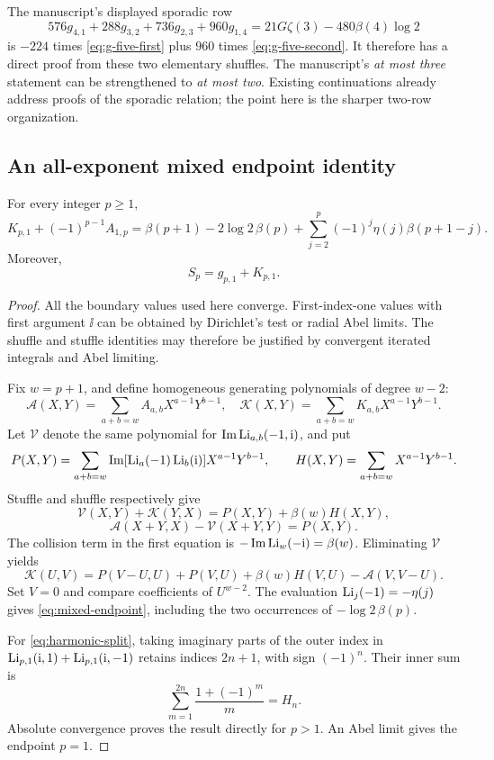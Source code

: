 The manuscript's displayed sporadic row
\[
 576g_{4,1}+288g_{3,2}+736g_{2,3}+960g_{1,4}
 =21G\zeta(3)-480\beta(4)\log2
\]
is \(-224\) times \eqref{eq:g-five-first} plus \(960\) times
\eqref{eq:g-five-second}. It therefore has a direct proof from
these two elementary shuffles. The manuscript's \emph{at most three}
statement can be strengthened to \emph{at most two}. Existing
continuations already address proofs of the sporadic relation; the
point here is the sharper two-row organization.

\subsection{An all-exponent mixed endpoint identity}

\begin{theorem}\label{thm:mixed-endpoint}
For every integer \(p\geq1\),
\begin{equation}\label{eq:mixed-endpoint}
 K_{p,1}+(-1)^{p-1}A_{1,p}
 =\beta(p+1)-2\log2\,\beta(p)
       +\sum_{j=2}^{p}(-1)^j\eta(j)\beta(p+1-j).
\end{equation}
Moreover,
\begin{equation}\label{eq:harmonic-split}
 S_p=g_{p,1}+K_{p,1}.
\end{equation}
\end{theorem}

\begin{proof}
All the boundary values used here converge. First-index-one values
with first argument \(\ii\) can be obtained by Dirichlet's test or
radial Abel limits. The shuffle and stuffle identities may therefore
be justified by convergent iterated integrals and Abel limiting.

Fix \(w=p+1\), and define homogeneous generating polynomials of
degree \(w-2\):
\[
 \mathscr A(X,Y)=\sum_{a+b=w}A_{a,b}X^{a-1}Y^{b-1},
 \quad
 \mathscr K(X,Y)=\sum_{a+b=w}K_{a,b}X^{a-1}Y^{b-1}.
\]
Let \(\mathscr V\) denote the same polynomial for
\(\operatorname{Im}\operatorname{Li}_{a,b}(-1,\mathrm{i})\), and put
\[
 P(X,Y)=\sum_{a+b=w}
  \operatorname{Im}[\operatorname{Li}_a(-1)\operatorname{Li}_b(\mathrm{i})]X^{a-1}Y^{b-1},
 \qquad
 H(X,Y)=\sum_{a+b=w}X^{a-1}Y^{b-1}.
\]
Stuffle and shuffle respectively give
\[
 \mathscr V(X,Y)+\mathscr K(Y,X)=P(X,Y)+\beta(w)H(X,Y),
\]
\[
 \mathscr A(X+Y,X)-\mathscr V(X+Y,Y)=P(X,Y).
\]
The collision term in the first equation is
\(-\operatorname{Im}\operatorname{Li}_w(-\mathrm{i})=\beta(w)\).
Eliminating \(\mathscr V\) yields
\[
 \mathscr K(U,V)=P(V-U,U)+P(V,U)+\beta(w)H(V,U)
                  -\mathscr A(V,V-U).
\]
Set \(V=0\) and compare coefficients of \(U^{w-2}\).
The evaluation \(\operatorname{Li}_j(-1)=-\eta(j)\) gives
\eqref{eq:mixed-endpoint}, including the two occurrences of
\(-\log2\,\beta(p)\).

For \eqref{eq:harmonic-split}, taking imaginary parts of the outer
index in \(\operatorname{Li}_{p,1}(\mathrm{i},1)+\operatorname{Li}_{p,1}(\mathrm{i},-1)\) retains indices
\(2n+1\), with sign \((-1)^n\). Their inner sum is
\[
 \sum_{m=1}^{2n}\frac{1+(-1)^m}{m}=H_n.
\]
Absolute convergence proves the result directly for \(p>1\).
An Abel limit gives the endpoint \(p=1\).
\end{proof}

